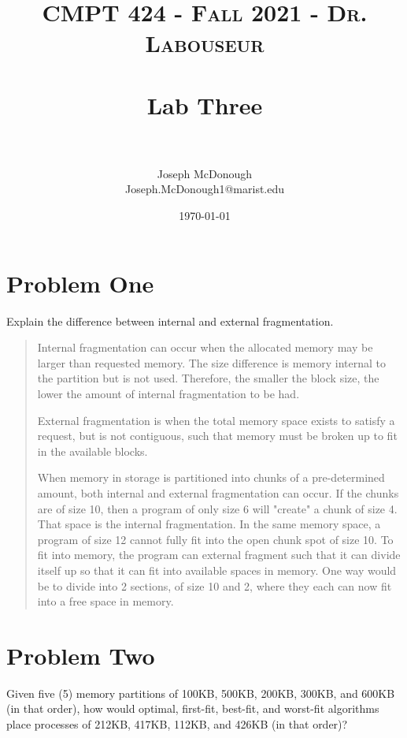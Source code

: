 \documentclass[letterpaper, 10pt,DIV=13]{scrartcl}
\title{	
   \normalfont \normalsize 
   \textsc{CMPT 424 - Fall 2021 - Dr. Labouseur} \\[10pt] %
   \horrule{0.5pt} \\[0.25cm] 	%
   \huge Lab Three  \\     	    %
   \horrule{0.5pt} \\[0.25cm] 	%
}
\author{Joseph McDonough \\ \normalsize Joseph.McDonough1@marist.edu}
\date{\normalsize\today} 	%
\numberwithin{equation}{section} %
\numberwithin{figure}{section} %
\numberwithin{table}{section} %
\begin{document}
\maketitle %

\section{Problem One}

Explain	the	difference	between	internal	and	external	fragmentation.

\begin{quote}

    Internal fragmentation can occur when the allocated memory may be larger than requested memory. The size difference is memory internal to the partition but is not used. Therefore, the smaller the block size, the lower the amount of internal fragmentation to be had. 

    External fragmentation is when the total memory space exists to satisfy a request, but is not contiguous, such that memory must be broken up to fit in the available blocks.

    When memory in storage is partitioned into chunks of a pre-determined amount, both internal and external fragmentation can occur. If the chunks are of size 10, then a program of only size 6 will "create" a chunk of size 4. That space is the internal fragmentation. In the same memory space, a program of size 12 cannot fully fit into the open chunk spot of size 10. To fit into memory, the program can external fragment such that it can divide itself up so that it can fit into available spaces in memory. One way would be to divide into 2 sections, of size 10 and 2, where they each can now fit into a free space in memory. 

\end{quote}


\section{Problem Two}
Given	five	(5)	memory	partitions	of	100KB,	500KB,	200KB,	300KB,	and	600KB	(in	that	
order),	how	would	optimal,	first-fit,	best-fit,	and	worst-fit	algorithms	place	processes	
of	212KB,	417KB,	112KB,	and	426KB	(in	that	order)?
\end{document}
